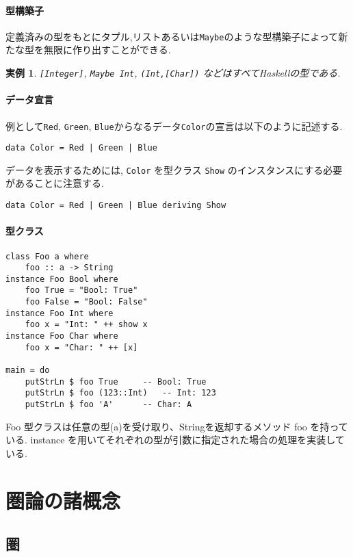 \documentclass[dvipdfmx]{jsbook}
\theoremstyle{plain}
\newtheorem{example}[thm]{実例}
\begin{document}
\subsection{型構築子}
定義済みの型をもとにタプル,リストあるいは\verb|Maybe|のような型構築子によって新たな型を無限に作り出すことができる.
\begin{example}
\verb|[Integer]|, \verb|Maybe Int|,
\verb|(Int,[Char])| などはすべてHaskellの型である.
\end{example}
\subsection{データ宣言}
例として\verb|Red|, \verb|Green|, \verb|Blue|からなるデータ\verb|Color|の宣言は以下のように記述する.
\begin{lstlisting}
data Color = Red | Green | Blue 
\end{lstlisting}
データを表示するためには, \verb|Color| を型クラス \verb|Show| のインスタンスにする必要があることに注意する.
\begin{lstlisting}
data Color = Red | Green | Blue deriving Show
\end{lstlisting}
\subsection{型クラス}
\begin{lstlisting}
class Foo a where
    foo :: a -> String
instance Foo Bool where
    foo True = "Bool: True"
    foo False = "Bool: False"
instance Foo Int where
    foo x = "Int: " ++ show x
instance Foo Char where
    foo x = "Char: " ++ [x]

main = do
    putStrLn $ foo True		-- Bool: True
    putStrLn $ foo (123::Int)	-- Int: 123
    putStrLn $ foo 'A'		-- Char: A
\end{lstlisting}
Foo 型クラスは任意の型(a)を受け取り、Stringを返却するメソッド foo を持っている. instance を用いてそれぞれの型が引数に指定された場合の処理を実装している.
\part{圏論の諸概念}
\chapter{圏}
\end{document}
